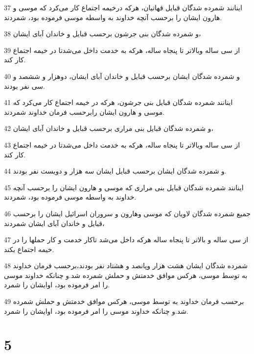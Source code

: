 \par 37 اینانند شمرده شدگان قبایل قهاتیان، هرکه درخیمه اجتماع کار می‌کرد که موسی و هارون ایشان را برحسب آنچه خداوند به واسطه موسی فرموده بود، شمردند.
\par 38 و شمرده شدگان بنی جرشون برحسب قبایل و خاندان آبای ایشان،
\par 39 از سی ساله وبالاتر تا پنجاه ساله، هرکه به خدمت داخل می‌شدتا در خیمه اجتماع کار کند.
\par 40 و شمرده شدگان ایشان برحسب قبایل و خاندان آبای ایشان، دوهزار و ششصد و سی نفر بودند.
\par 41 اینانند شمرده شدگان قبایل بنی جرشون، هرکه در خیمه اجتماع کار می‌کرد که موسی و هارون ایشان رابرحسب فرمان خداوند شمردند.
\par 42 و شمرده شدگان قبایل بنی مراری برحسب قبایل و خاندان آبای ایشان،
\par 43 از سی ساله وبالاتر تا پنجاه ساله، هرکه به خدمت داخل می‌شدتا در خیمه اجتماع کار کند.
\par 44 و شمرده شدگان ایشان برحسب قبایل ایشان سه هزار و دویست نفر بودند.
\par 45 اینانند شمرده شدگان قبایل بنی مراری که موسی و هارون ایشان را برحسب آنچه خداوند به واسطه موسی فرموده بود، شمردند.
\par 46 جمیع شمرده شدگان لاویان که موسی وهارون و سروران اسرائیل ایشان را برحسب قبایل و خاندان آبای ایشان شمردند،
\par 47 از سی ساله و بالاتر تا پنجاه ساله هرکه داخل می‌شد تاکار خدمت و کار حملها را در خیمه اجتماع بکند.
\par 48 شمرده شدگان ایشان هشت هزار وپانصد و هشتاد نفر بودند،برحسب فرمان خداوند به توسط موسی، هرکس موافق خدمتش و حملش شمرده شد.و چنانکه خداوند موسی را امر فرموده بود، اوایشان را شمرد.
\par 49 برحسب فرمان خداوند به توسط موسی، هرکس موافق خدمتش و حملش شمرده شد.و چنانکه خداوند موسی را امر فرموده بود، اوایشان را شمرد.
 
\chapter{5}

